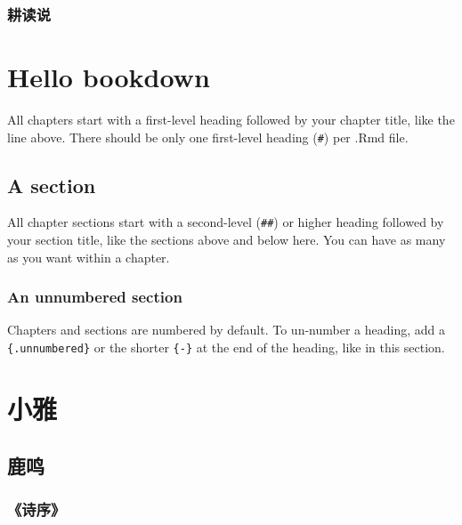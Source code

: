 \documentclass[
]{book}
\theoremstyle{definition}
\theoremstyle{definition}
\theoremstyle{definition}
\theoremstyle{definition}
\theoremstyle{remark}
\begin{document}
\hypertarget{ux8015ux8bfbux8bf4-1}{%
\subsection{耕读说}\label{ux8015ux8bfbux8bf4-1}}

\hypertarget{hello-bookdown}{%
\chapter{Hello bookdown}\label{hello-bookdown}}

All chapters start with a first-level heading followed by your chapter title, like the line above. There should be only one first-level heading (\texttt{\#}) per .Rmd file.

\hypertarget{a-section}{%
\section{A section}\label{a-section}}

All chapter sections start with a second-level (\texttt{\#\#}) or higher heading followed by your section title, like the sections above and below here. You can have as many as you want within a chapter.

\hypertarget{an-unnumbered-section}{%
\subsection*{An unnumbered section}\label{an-unnumbered-section}}

Chapters and sections are numbered by default. To un-number a heading, add a \texttt{\{.unnumbered\}} or the shorter \texttt{\{-\}} at the end of the heading, like in this section.

\hypertarget{ux5c0fux96c5}{%
\chapter*{小雅}\label{ux5c0fux96c5}}

\hypertarget{ux9e7fux9e23}{%
\section*{鹿鸣}\label{ux9e7fux9e23}}

\hypertarget{ux8bd7ux5e8f}{%
\subsection*{《诗序》}\label{ux8bd7ux5e8f}}
\end{document}
